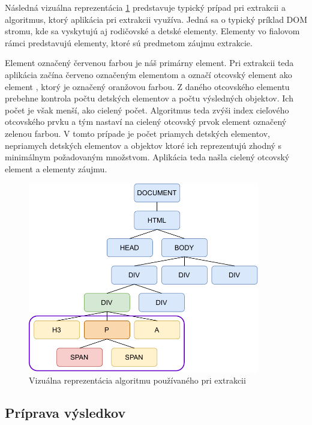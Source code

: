 \newpage

Následná vizuálna reprezentácia \ref{domvisual} predstavuje typický prípad pri extrakcii a algoritmus, ktorý aplikácia pri extrakcii využíva. Jedná sa o typický príklad DOM stromu, kde sa vyskytujú aj rodičovské a detské elementy. Elementy vo fialovom rámci predstavujú elementy, ktoré sú predmetom záujmu extrakcie. 

Element  označený červenou farbou je náš primárny element. Pri extrakcii teda aplikácia začína červeno označeným elementom  a označí otcovský element ako element , ktorý je označený oranžovou farbou. Z daného otcovského elementu prebehne kontrola počtu detských elementov a počtu výsledných objektov. Ich počet je však menší, ako cielený počet. Algoritmus teda zvýši index cieľového otcovského prvku a tým nastaví na cielený otcovský prvok element  označený zelenou farbou. V tomto prípade je počet priamych detských elementov, nepriamych detských elementov a objektov ktoré ich reprezentujú zhodný s minimálnym požadovaným množstvom. Aplikácia teda našla cielený otcovský element a elementy záujmu.

\bigskip

 \begin{figure}[hbt]
	\centering
	\includegraphics[width=0.9\textwidth]{obrazky-figures/dom.pdf}
	\caption{Vizuálna reprezentácia algoritmu používaného pri extrakcii}
	\label{domvisual}
\end{figure}

\newpage

\subsection{Príprava výsledkov}

